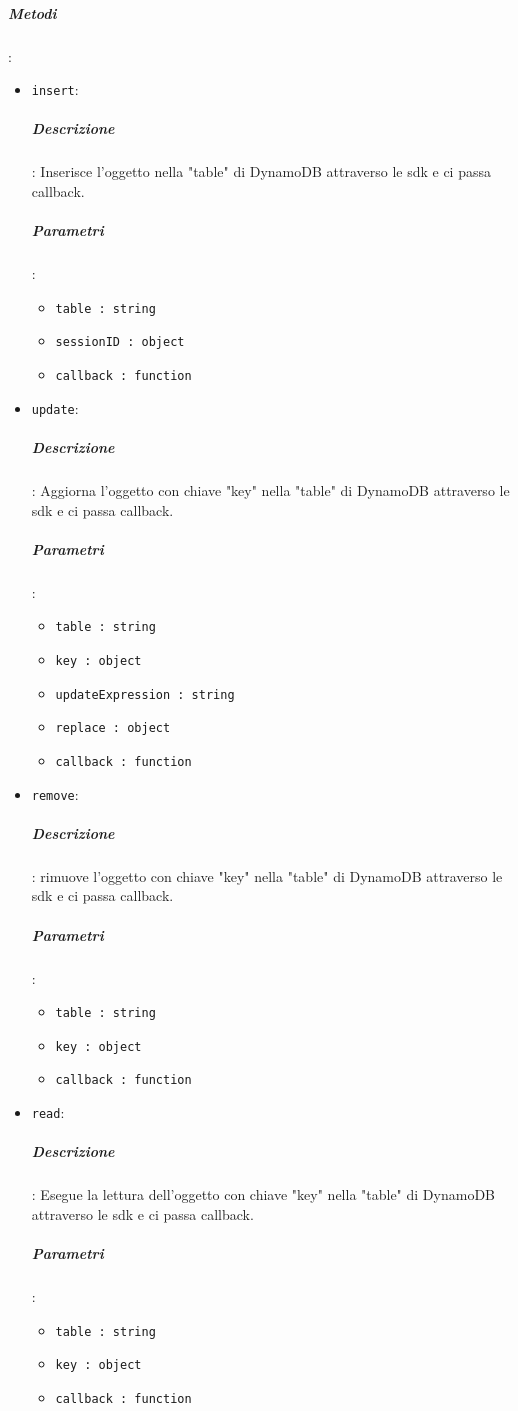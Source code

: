 \documentclass[../DefinizioneDiProdotto_v2.0.0.tex]{subfiles}
\begin{document}
\subparagraph{Metodi}:\begin{itemize}
\item \texttt{insert}:
\subparagraph{Descrizione}: Inserisce l'oggetto nella "table" di DynamoDB attraverso le sdk e ci passa callback.
\subparagraph{Parametri}:
\begin{itemize}
	\item \texttt{table : string}
	\item \texttt{sessionID : object}
	\item \texttt{callback : function}
\end{itemize}
\item \texttt{update}:
\subparagraph{Descrizione}: Aggiorna l'oggetto con chiave "key" nella "table" di DynamoDB attraverso le sdk e ci passa callback.
\subparagraph{Parametri}:
\begin{itemize}
	\item \texttt{table : string}
	\item \texttt{key : object}
	\item \texttt{updateExpression : string}
	\item \texttt{replace : object}
	\item \texttt{callback : function}
\end{itemize}

\item \texttt{remove}:
\subparagraph{Descrizione}: rimuove l'oggetto con chiave "key" nella "table" di DynamoDB attraverso le sdk e ci passa callback.
\subparagraph{Parametri}:
\begin{itemize}
	\item \texttt{table : string}
	\item \texttt{key : object}
	\item \texttt{callback : function}
\end{itemize}

\item \texttt{read}:
\subparagraph{Descrizione}: Esegue la lettura dell'oggetto con chiave "key" nella "table" di DynamoDB attraverso le sdk e ci passa callback.
\subparagraph{Parametri}:
\begin{itemize}
	\item \texttt{table : string}
	\item \texttt{key : object}
	\item \texttt{callback : function}
\end{itemize}


\end{itemize}
\end{document}
